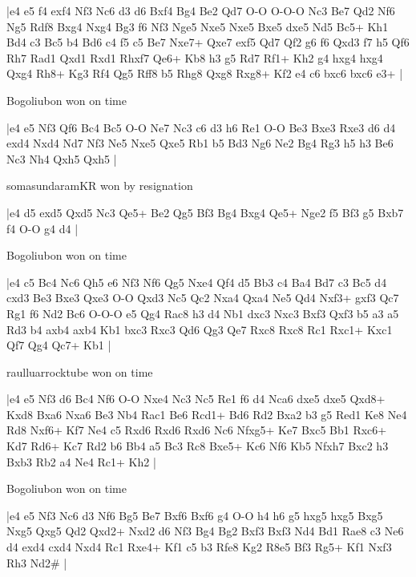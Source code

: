 \makegametitle
|e4 e5 f4 exf4 Nf3 Nc6 d3 d6 Bxf4 Bg4 Be2 Qd7 O-O O-O-O Nc3 Be7 Qd2 Nf6 Ng5 Rdf8 Bxg4 Nxg4 Bg3 f6 Nf3 Nge5 Nxe5 Nxe5 Bxe5 dxe5 Nd5 Bc5+ Kh1 Bd4 c3 Bc5 b4 Bd6 c4 f5 c5 Be7 Nxe7+ Qxe7 exf5 Qd7 Qf2 g6 f6 Qxd3 f7 h5 Qf6 Rh7 Rad1 Qxd1 Rxd1 Rhxf7 Qe6+ Kb8 h3 g5 Rd7 Rf1+ Kh2 g4 hxg4 hxg4 Qxg4 Rh8+ Kg3 Rf4 Qg5 Rff8 b5 Rhg8 Qxg8 Rxg8+ Kf2 e4 c6 bxc6 bxc6 e3+  |

\showboard

Bogoliubon won on time

\makegametitle
|e4 e5 Nf3 Qf6 Bc4 Bc5 O-O Ne7 Nc3 c6 d3 h6 Re1 O-O Be3 Bxe3 Rxe3 d6 d4 exd4 Nxd4 Nd7 Nf3 Ne5 Nxe5 Qxe5 Rb1 b5 Bd3 Ng6 Ne2 Bg4 Rg3 h5 h3 Be6 Nc3 Nh4 Qxh5 Qxh5  |

\showboard

somasundaramKR won by resignation

\makegametitle
|e4 d5 exd5 Qxd5 Nc3 Qe5+ Be2 Qg5 Bf3 Bg4 Bxg4 Qe5+ Nge2 f5 Bf3 g5 Bxb7 f4 O-O g4 d4  |

\showboard

Bogoliubon won on time

\makegametitle
|e4 c5 Bc4 Nc6 Qh5 e6 Nf3 Nf6 Qg5 Nxe4 Qf4 d5 Bb3 c4 Ba4 Bd7 c3 Bc5 d4 cxd3 Be3 Bxe3 Qxe3 O-O Qxd3 Nc5 Qc2 Nxa4 Qxa4 Ne5 Qd4 Nxf3+ gxf3 Qc7 Rg1 f6 Nd2 Bc6 O-O-O e5 Qg4 Rac8 h3 d4 Nb1 dxc3 Nxc3 Bxf3 Qxf3 b5 a3 a5 Rd3 b4 axb4 axb4 Kb1 bxc3 Rxc3 Qd6 Qg3 Qe7 Rxc8 Rxc8 Rc1 Rxc1+ Kxc1 Qf7 Qg4 Qc7+ Kb1  |

\showboard

raulluarrocktube won on time

\makegametitle
|e4 e5 Nf3 d6 Bc4 Nf6 O-O Nxe4 Nc3 Nc5 Re1 f6 d4 Nca6 dxe5 dxe5 Qxd8+ Kxd8 Bxa6 Nxa6 Be3 Nb4 Rac1 Be6 Rcd1+ Bd6 Rd2 Bxa2 b3 g5 Red1 Ke8 Ne4 Rd8 Nxf6+ Kf7 Ne4 c5 Rxd6 Rxd6 Rxd6 Nc6 Nfxg5+ Ke7 Bxc5 Bb1 Rxc6+ Kd7 Rd6+ Kc7 Rd2 b6 Bb4 a5 Bc3 Rc8 Bxe5+ Kc6 Nf6 Kb5 Nfxh7 Bxc2 h3 Bxb3 Rb2 a4 Ne4 Rc1+ Kh2  |

\showboard

Bogoliubon won on time

\makegametitle
|e4 e5 Nf3 Nc6 d3 Nf6 Bg5 Be7 Bxf6 Bxf6 g4 O-O h4 h6 g5 hxg5 hxg5 Bxg5 Nxg5 Qxg5 Qd2 Qxd2+ Nxd2 d6 Nf3 Bg4 Bg2 Bxf3 Bxf3 Nd4 Bd1 Rae8 c3 Ne6 d4 exd4 cxd4 Nxd4 Rc1 Rxe4+ Kf1 c5 b3 Rfe8 Kg2 R8e5 Bf3 Rg5+ Kf1 Nxf3 Rh3 Nd2\#  |

